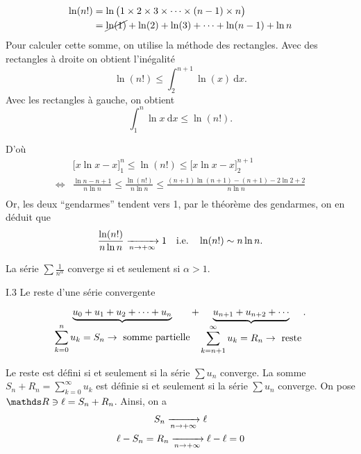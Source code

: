 \begin{exo}
	\begin{align*}
		\ln(n!) &= \ln\big(1 \times 2 \times 3 \times \cdots \times (n-1)\times n\big) \\
		&= \cancel{\ln(1)} + \ln(2) + \ln(3) + \cdots + \ln(n-1) + \ln n \\
	\end{align*}
	Pour calculer cette somme, on utilise la méthode des rectangles. Avec des rectangles à droite on obtient l'inégalité \[
		\ln(n!) \le \int_{2}^{n+1} \ln(x)~\mathrm{d}x
	.\]
	Avec les rectangles à gauche, on obtient \[
		\int_{1}^{n} \ln x~\mathrm{d}x \le \ln(n!)
	.\]

	D'où
	\begin{align*}
		&\big[x \ln x - x\big]_1^n \le \ln(n!) \le \big[x \ln x - x\big]_2^{n+1}\\
		\iff& \frac{\ln n - n + 1}{n \ln n} \le \frac{\ln(n!)}{n\ln n} \le \frac{(n+1) \ln(n+1) - (n+1) - 2\ln 2 + 2}{n \ln n}\\
	\end{align*}
	Or, les deux ``gendarmes'' tendent vers 1, par le théorème des gendarmes, on en déduit que \[
		\frac{\ln (n!)}{n\ln n} \xrightarrow[n\to +\infty]{} 1 \quad\text{i.e.}\quad \ln(n!) \sim n \ln n
	.\]
\end{exo}

\begin{prop}
	La série $\sum \frac{1}{n^{\alpha}}$\/ converge si et seulement si $\alpha > 1$.
\end{prop}

\bigskip

\begin{center}
	\large\sc I.3 \quad Le reste d'une série convergente
\end{center}

\bigskip
\[
	\underbrace{u_0 + u_1 + u_2 + \cdots + u_n}_{{\displaystyle\sum_{k = 0}^n u_k = S_n \to \text{ somme partielle}}} + \underbrace{u_{n+1} + u_{n+2} + \cdots}_{\displaystyle\sum_{k=n+1}^{\infty} u_k = R_n \to \text{ reste}}
.\]

Le reste est défini si et seulement si la série $\sum u_n$\/ converge. La somme $S_n + R_n = \sum_{k=0}^{\infty} u_k$\/ est définie si et seulement si la série $\sum u_n$\/ converge. On pose $\R \ni \ell = S_n + R_n$. Ainsi, on a
\begin{gather*}
	S_n \xrightarrow[n\to +\infty]{} \ell\\
	\ell - S_n = R_n \xrightarrow[n\to +\infty]{} \ell - \ell = 0
\end{gather*}

